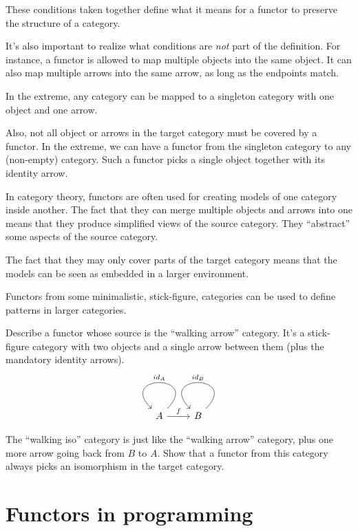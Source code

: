 \documentclass[DaoFP]{subfiles}
\begin{document}
These conditions taken together define what it means for a functor to preserve the structure of a category.

It's also important to realize what conditions are \emph{not} part of the definition. For instance, a functor is allowed to map multiple objects into the same object. It can also map multiple arrows into the same arrow, as long as the endpoints match. 

In the extreme, any category can be mapped to a singleton category with one object and one arrow.

Also, not all object or arrows in the target category must be covered by a functor. In the extreme, we can have a functor from the singleton category to any (non-empty) category. Such a functor picks a single object together with its identity arrow.

In category theory, functors are often used for creating models of one category inside another. The fact that they can merge multiple objects and arrows into one means that they produce simplified views of the source category. They ``abstract'' some aspects of the source category.

The fact that they may only cover parts of the target category means that the models can be seen as embedded in a larger environment.

Functors from some minimalistic, stick-figure, categories can be used to define patterns in larger categories.

\begin{exercise}
Describe a functor whose source is the ``walking arrow'' category. It's a stick-figure category with two objects and a single arrow between them (plus the mandatory identity arrows).
\[
 \begin{tikzcd}
 A 
  \arrow[loop,  "id_A"']
\arrow[r, "f"]
 & B
  \arrow[loop, "id_{B}"']
  \end{tikzcd}
\]
\end{exercise}
\begin{exercise}
The ``walking iso'' category is just like the ``walking arrow'' category, plus one more arrow going back from $B$ to $A$. Show that a functor from this category always picks an isomorphism in the target category. 
\end{exercise}

\section{Functors in programming}
\end{document}
